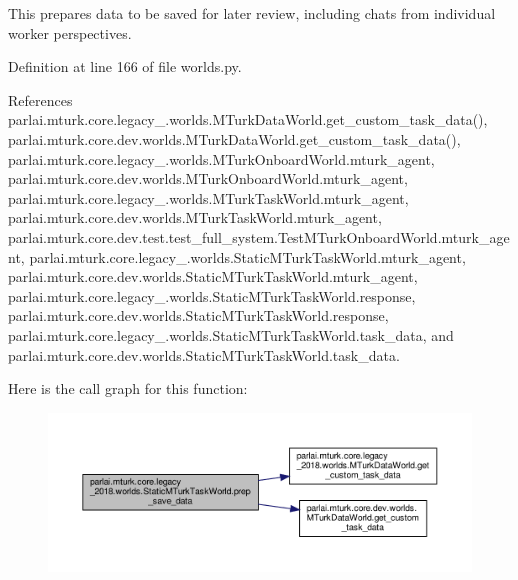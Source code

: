 \begin{DoxyVerb}This prepares data to be saved for later review, including
chats from individual worker perspectives.\end{DoxyVerb}
 

Definition at line 166 of file worlds.\+py.



References parlai.\+mturk.\+core.\+legacy\+\_.\+worlds.\+M\+Turk\+Data\+World.\+get\+\_\+custom\+\_\+task\+\_\+data(), parlai.\+mturk.\+core.\+dev.\+worlds.\+M\+Turk\+Data\+World.\+get\+\_\+custom\+\_\+task\+\_\+data(), parlai.\+mturk.\+core.\+legacy\+\_.\+worlds.\+M\+Turk\+Onboard\+World.\+mturk\+\_\+agent, parlai.\+mturk.\+core.\+dev.\+worlds.\+M\+Turk\+Onboard\+World.\+mturk\+\_\+agent, parlai.\+mturk.\+core.\+legacy\+\_.\+worlds.\+M\+Turk\+Task\+World.\+mturk\+\_\+agent, parlai.\+mturk.\+core.\+dev.\+worlds.\+M\+Turk\+Task\+World.\+mturk\+\_\+agent, parlai.\+mturk.\+core.\+dev.\+test.\+test\+\_\+full\+\_\+system.\+Test\+M\+Turk\+Onboard\+World.\+mturk\+\_\+agent, parlai.\+mturk.\+core.\+legacy\+\_.\+worlds.\+Static\+M\+Turk\+Task\+World.\+mturk\+\_\+agent, parlai.\+mturk.\+core.\+dev.\+worlds.\+Static\+M\+Turk\+Task\+World.\+mturk\+\_\+agent, parlai.\+mturk.\+core.\+legacy\+\_.\+worlds.\+Static\+M\+Turk\+Task\+World.\+response, parlai.\+mturk.\+core.\+dev.\+worlds.\+Static\+M\+Turk\+Task\+World.\+response, parlai.\+mturk.\+core.\+legacy\+\_.\+worlds.\+Static\+M\+Turk\+Task\+World.\+task\+\_\+data, and parlai.\+mturk.\+core.\+dev.\+worlds.\+Static\+M\+Turk\+Task\+World.\+task\+\_\+data.

Here is the call graph for this function\+:
\nopagebreak
\begin{figure}[H]
\begin{center}
\leavevmode
\includegraphics[width=350pt]{classparlai_1_1mturk_1_1core_1_1legacy__2018_1_1worlds_1_1StaticMTurkTaskWorld_a7f263553ea616c3ae36124e5fcab4dc2_cgraph}
\end{center}
\end{figure}
\mbox{\label{classparlai_1_1mturk_1_1core_1_1legacy__2018_1_1worlds_1_1StaticMTurkTaskWorld_a9613b5a6a25c4e6f60bd1da6057cb575}} 
